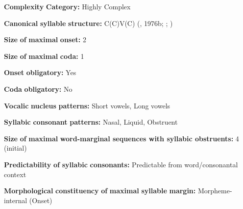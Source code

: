 \begin{styleBody}
\textbf{Complexity} \textbf{Category:} Highly Complex 
\end{styleBody}

\begin{styleBody}
\textbf{Canonical} \textbf{syllable} \textbf{structure:} C(C)V(C) (\citealt{Diffloth1976a}, 1976b; \citealt{Sloan1988}; \citealt{Philips2007})
\end{styleBody}

\begin{styleBody}
\textbf{Size} \textbf{of} \textbf{maximal} \textbf{onset:} 2
\end{styleBody}

\begin{styleBody}
\textbf{Size} \textbf{of} \textbf{maximal} \textbf{coda:} 1
\end{styleBody}

\begin{styleBody}
\textbf{Onset} \textbf{obligatory:} Yes
\end{styleBody}

\begin{styleBody}
\textbf{Coda} \textbf{obligatory:} No
\end{styleBody}

\begin{styleBody}
\textbf{Vocalic} \textbf{nucleus} \textbf{patterns:} Short vowels, Long vowels
\end{styleBody}

\begin{styleBody}
\textbf{Syllabic} \textbf{consonant} \textbf{patterns:} Nasal, Liquid, Obstruent
\end{styleBody}

\begin{styleBody}
\textbf{Size} \textbf{of} \textbf{maximal} \textbf{word{}-marginal sequences with syllabic obstruents:} 4 (initial)
\end{styleBody}

\begin{styleBody}
\textbf{Predictability} \textbf{of} \textbf{syllabic} \textbf{consonants:} Predictable from word/consonantal context
\end{styleBody}

\begin{styleBody}
\textbf{Morphological} \textbf{constituency} \textbf{of} \textbf{maximal} \textbf{syllable} \textbf{margin:} Morpheme-internal (Onset)
\end{styleBody}

